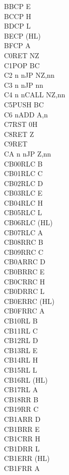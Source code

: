 \documentclass[twoside,openright,a4paper]{book}
\begin{document}
\begin{multicols}{3}
{\begin{tabbing}
	BB\>CP E\\
	BC\>CP H\\
	BD\>CP L\\
	BE\>CP (HL)\\
	BF\>CP A\\
	C0\>RET NZ\\
	C1\>POP BC\\
	C2 n n\>JP NZ,nn\\
	C3 n n\>JP nn\\
	C4 n n\>CALL NZ,nn\\
	C5\>PUSH BC\\
	C6 n\>ADD A,n\\
	C7\>RST 0H\\
	C8\>RET Z\\
	C9\>RET\\
	CA n n\>JP Z,nn\\
	CB00\>RLC B\\
	CB01\>RLC C\\
	CB02\>RLC D\\
	CB03\>RLC E\\
	CB04\>RLC H\\
	CB05\>RLC L\\
	CB06\>RLC (HL)\\
	CB07\>RLC A\\
	CB08\>RRC B\\
	CB09\>RRC C\\
	CB0A\>RRC D\\
	CB0B\>RRC E\\
	CB0C\>RRC H\\
	CB0D\>RRC L\\
	CB0E\>RRC (HL)\\
	CB0F\>RRC A\\
	CB10\>RL B\\
	CB11\>RL C\\
	CB12\>RL D\\
	CB13\>RL E\\
	CB14\>RL H\\
	CB15\>RL L\\
	CB16\>RL (HL)\\
	CB17\>RL A\\
	CB18\>RR B\\
	CB19\>RR C\\
	CB1A\>RR D\\
	CB1B\>RR E\\
	CB1C\>RR H\\
	CB1D\>RR L\\
	CB1E\>RR (HL)\\
	CB1F\>RR A\\

\end{tabbing}}
\end{multicols}
\end{document}
